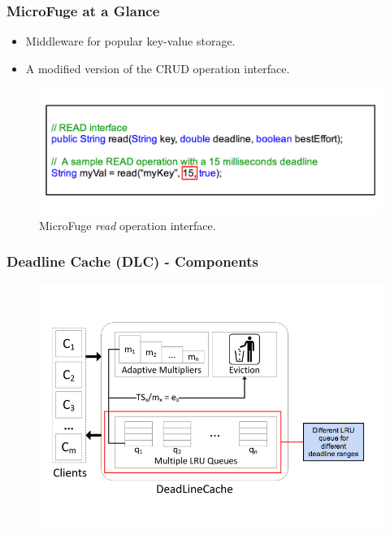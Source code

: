 \documentclass{beamer}
\newcommand{\myv}{\vspace{3 mm}}
\begin{document}
\begin{frame}
  \frametitle{MicroFuge at a Glance}
  \begin{itemize}
  \item Middleware for popular key-value storage.
    \myv
  \item A modified version of the CRUD operation interface.
  \end{itemize}
  \begin{figure}
\vspace{-5 mm}
  \includegraphics[scale=0.25]{img/MicroFuge_protocol.png}
  \caption{MicroFuge \textit{read} operation interface.}
  \end{figure}
\end{frame}

\begin{frame}
  \frametitle{Deadline Cache (DLC) - Components}
  \begin{figure}
    \begin{center}
      \centerline{\includegraphics[scale=0.38]{img/DLC_ARC_1.png}}
    \end{center}
  \end{figure}
\end{frame}
\end{document}
